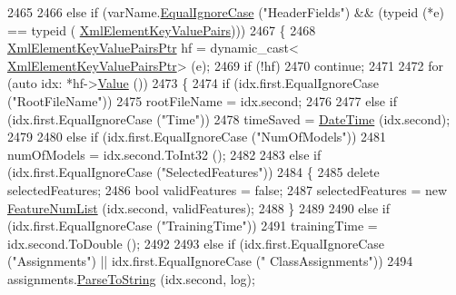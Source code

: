 \begin{DoxyCode}
2465 
2466       \textcolor{keywordflow}{else} \textcolor{keywordflow}{if}  (varName.\hyperlink{class_k_k_b_1_1_k_k_str_a562f9696417c53f66bc4088eac072ab5}{EqualIgnoreCase} (\textcolor{stringliteral}{"HeaderFields"})  &&  (\textcolor{keyword}{typeid} (*e) == \textcolor{keyword}{typeid} (
      \hyperlink{class_k_k_b_1_1_xml_element_key_value_pairs}{XmlElementKeyValuePairs})))
2467       \{
2468         \hyperlink{class_k_k_b_1_1_xml_element_key_value_pairs}{XmlElementKeyValuePairsPtr} hf = \textcolor{keyword}{dynamic\_cast<}
      \hyperlink{class_k_k_b_1_1_xml_element_key_value_pairs}{XmlElementKeyValuePairsPtr}\textcolor{keyword}{>} (e);
2469         \textcolor{keywordflow}{if}  (!hf)
2470           \textcolor{keywordflow}{continue};
2471 
2472         \textcolor{keywordflow}{for}  (\textcolor{keyword}{auto}  idx: *hf->\hyperlink{class_k_k_b_1_1_xml_element_key_value_pairs_ad9d419323ca34af818aac7304f0bc388}{Value} ())
2473         \{
2474           \textcolor{keywordflow}{if}  (idx.first.EqualIgnoreCase (\textcolor{stringliteral}{"RootFileName"}))
2475             rootFileName = idx.second;
2476 
2477           \textcolor{keywordflow}{else} if  (idx.first.EqualIgnoreCase (\textcolor{stringliteral}{"Time"}))
2478             timeSaved = \hyperlink{class_k_k_b_1_1_date_time}{DateTime} (idx.second);
2479 
2480           \textcolor{keywordflow}{else} \textcolor{keywordflow}{if}  (idx.first.EqualIgnoreCase (\textcolor{stringliteral}{"NumOfModels"}))
2481             numOfModels = idx.second.ToInt32 ();
2482 
2483           \textcolor{keywordflow}{else} \textcolor{keywordflow}{if}  (idx.first.EqualIgnoreCase (\textcolor{stringliteral}{"SelectedFeatures"}))
2484           \{
2485             \textcolor{keyword}{delete}  selectedFeatures;
2486             \textcolor{keywordtype}{bool}  validFeatures = \textcolor{keyword}{false};
2487             selectedFeatures  = \textcolor{keyword}{new} \hyperlink{class_k_k_m_l_l_1_1_feature_num_list}{FeatureNumList} (idx.second, validFeatures);
2488           \}
2489 
2490           \textcolor{keywordflow}{else} \textcolor{keywordflow}{if}  (idx.first.EqualIgnoreCase (\textcolor{stringliteral}{"TrainingTime"}))
2491             trainingTime = idx.second.ToDouble ();
2492 
2493           \textcolor{keywordflow}{else} \textcolor{keywordflow}{if}  (idx.first.EqualIgnoreCase (\textcolor{stringliteral}{"Assignments"})  ||  idx.first.EqualIgnoreCase (\textcolor{stringliteral}{"
      ClassAssignments"}))
2494             assignments.\hyperlink{class_k_k_m_l_l_1_1_class_assignments_a741ad292e58ea0dcd057776fa0a62da7}{ParseToString} (idx.second, log);

\end{DoxyCode}

